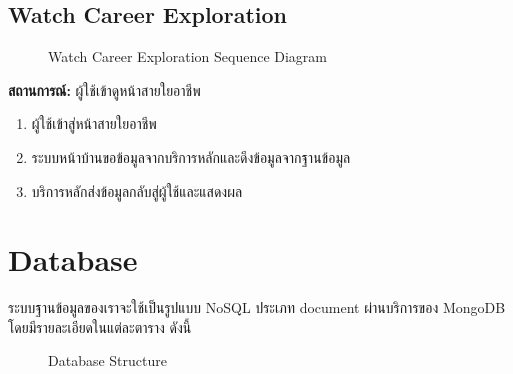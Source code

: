 \subsection{Watch Career Exploration}
\begin{figure}[H]\centering
    \setlength{\fboxrule}{0.2mm} %
    \caption{Watch Career Exploration Sequence Diagram}\label{fig:exploreSeqDiagram}
\end{figure}
\textbf{สถานการณ์: }ผู้ใช้เข้าดูหน้าสายใยอาชีพ
\begin{enumerate}
    \item ผู้ใช้เข้าสู่หน้าสายใยอาชีพ
    \item ระบบหน้าบ้านขอข้อมูลจากบริการหลักและดึงข้อมูลจากฐานข้อมูล
    \item บริการหลักส่งข้อมูลกลับสู่ผู้ใช้และแสดงผล
\end{enumerate}



\section{Database}
ระบบฐานข้อมูลของเราจะใช้เป็นรูปแบบ NoSQL ประเภท document ผ่านบริการของ MongoDB โดยมีรายละเอียดในแต่ละตาราง ดังนี้
\begin{figure}[H]\centering
    \setlength{\fboxrule}{0.2mm} %
    \setlength{\fboxsep}{0.5cm}
    \caption{Database Structure}\label{fig:database}
\end{figure}

